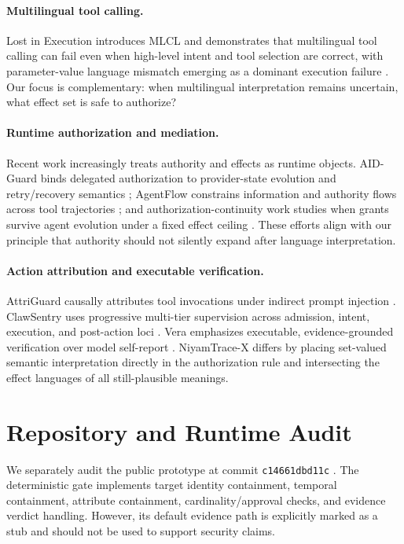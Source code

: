 \paragraph{Multilingual tool calling.}
Lost in Execution introduces MLCL and demonstrates that multilingual tool calling can fail even when high-level intent and tool selection are correct, with parameter-value language mismatch emerging as a dominant execution failure \cite{lostexecution2026}. Our focus is complementary: when multilingual interpretation remains uncertain, what effect set is safe to authorize?

\paragraph{Runtime authorization and mediation.}
Recent work increasingly treats authority and effects as runtime objects. AID-Guard binds delegated authorization to provider-state evolution and retry/recovery semantics \cite{aidguard2026}; AgentFlow constrains information and authority flows across tool trajectories \cite{agentflow2026}; and authorization-continuity work studies when grants survive agent evolution under a fixed effect ceiling \cite{authcontinuity2026}. These efforts align with our principle that authority should not silently expand after language interpretation.

\paragraph{Action attribution and executable verification.}
AttriGuard causally attributes tool invocations under indirect prompt injection \cite{attriguard2026}. ClawSentry uses progressive multi-tier supervision across admission, intent, execution, and post-action loci \cite{clawsentry2026}. Vera emphasizes executable, evidence-grounded verification over model self-report \cite{vera2026}. NiyamTrace-X differs by placing set-valued semantic interpretation directly in the authorization rule and intersecting the effect languages of all still-plausible meanings.

\section{Repository and Runtime Audit}
\label{sec:audit}

We separately audit the public prototype at commit \texttt{c14661dbd11c} \cite{niyamtrace_repo}. The deterministic gate implements target identity containment, temporal containment, attribute containment, cardinality/approval checks, and evidence verdict handling. However, its default evidence path is explicitly marked as a stub and should not be used to support security claims.

